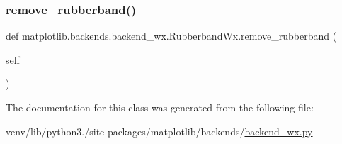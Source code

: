 \subsubsection{\texorpdfstring{remove\+\_\+rubberband()}{remove\_rubberband()}}
{\footnotesize\ttfamily def matplotlib.\+backends.\+backend\+\_\+wx.\+Rubberband\+Wx.\+remove\+\_\+rubberband (\begin{DoxyParamCaption}\item[{}]{self }\end{DoxyParamCaption})}



The documentation for this class was generated from the following file\+:\begin{DoxyCompactItemize}
\item 
venv/lib/python3./site-\/packages/matplotlib/backends/\hyperlink{backend__wx_8py}{backend\+\_\+wx.\+py}\end{DoxyCompactItemize}
